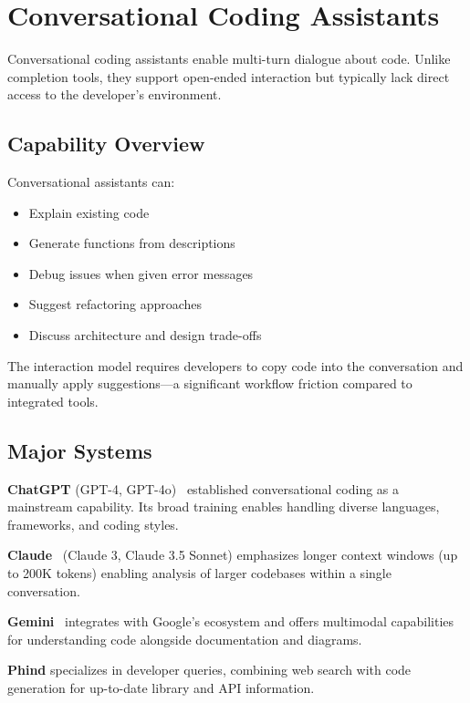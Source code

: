 \section{Conversational Coding Assistants}
\label{sec:conversational}

Conversational coding assistants enable multi-turn dialogue about code. Unlike completion tools, they support open-ended interaction but typically lack direct access to the developer's environment.

\subsection{Capability Overview}

Conversational assistants can:
\begin{itemize}
    \item Explain existing code
    \item Generate functions from descriptions
    \item Debug issues when given error messages
    \item Suggest refactoring approaches
    \item Discuss architecture and design trade-offs
\end{itemize}

The interaction model requires developers to copy code into the conversation and manually apply suggestions---a significant workflow friction compared to integrated tools.

\subsection{Major Systems}

\textbf{ChatGPT} (GPT-4, GPT-4o)~\citep{openai2023gpt4} established conversational coding as a mainstream capability. Its broad training enables handling diverse languages, frameworks, and coding styles.

\textbf{Claude}~\citep{anthropic2024claude} (Claude 3, Claude 3.5 Sonnet) emphasizes longer context windows (up to 200K tokens) enabling analysis of larger codebases within a single conversation.

\textbf{Gemini}~\citep{google2024gemini} integrates with Google's ecosystem and offers multimodal capabilities for understanding code alongside documentation and diagrams.

\textbf{Phind} specializes in developer queries, combining web search with code generation for up-to-date library and API information.

